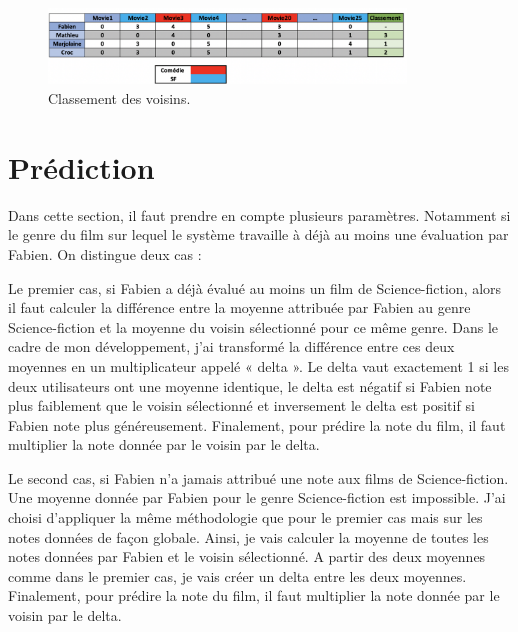 \vspace{5mm}


\begin{figure}[htp]
  \centering
  \includegraphics[width=95mm]{./src_img/apport_classement}
  \caption{Classement des voisins.}
  \label{fig:a-trois}
\end{figure}

\vspace{5mm}

\section{Prédiction}

Dans cette section, il faut prendre en compte plusieurs paramètres. Notamment si le genre du film sur lequel le système travaille à déjà au moins une évaluation par Fabien. On distingue deux cas : 

\vspace{5mm}

Le premier cas, si Fabien a déjà évalué au moins un film de Science-fiction, alors il faut calculer la différence entre la moyenne attribuée par Fabien au genre Science-fiction et la moyenne du voisin sélectionné pour ce même genre. Dans le cadre de mon développement, j’ai transformé la différence entre ces deux moyennes en un multiplicateur appelé « delta ». Le delta vaut exactement 1 si les deux utilisateurs ont une moyenne identique, le delta est négatif si Fabien note plus faiblement que le voisin sélectionné et inversement le delta est positif si Fabien note plus généreusement. Finalement, pour prédire la note du film, il faut multiplier la note donnée par le voisin par le delta. 

\vspace{5mm}

Le second cas, si Fabien n’a jamais attribué une note aux films de Science-fiction. Une moyenne donnée par Fabien pour le genre Science-fiction est impossible. J’ai choisi d’appliquer la même méthodologie que pour le premier cas mais sur les notes données de façon globale. Ainsi, je vais calculer la moyenne de toutes les notes données par Fabien et le voisin sélectionné. A partir des deux moyennes comme dans le premier cas, je vais créer un delta entre les deux moyennes. Finalement, pour prédire la note du film, il faut multiplier la note donnée par le voisin par le delta. 

